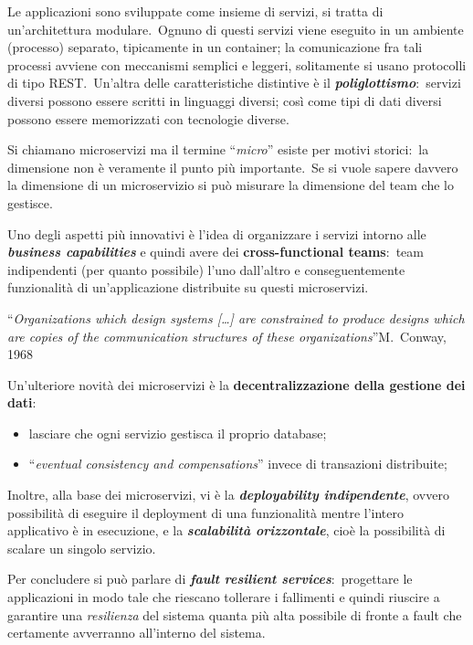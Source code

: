 Le applicazioni sono sviluppate come insieme di servizi, si tratta di un'architettura modulare.\
Ognuno di questi servizi viene eseguito in un ambiente (processo) separato, tipicamente in un container; la comunicazione fra tali processi avviene con meccanismi semplici e leggeri, solitamente si usano protocolli di tipo REST.\
Un'altra delle caratteristiche distintive è il \textbf{\textit{poliglottismo}}:\ servizi diversi possono essere scritti in linguaggi diversi; così come tipi di dati diversi possono essere memorizzati con tecnologie diverse.\

Si chiamano microservizi ma il termine ``\textit{micro}'' esiste per motivi storici:\ la dimensione non è veramente il punto più importante.\
Se si vuole sapere davvero la dimensione di un microservizio si può misurare la dimensione del team che lo gestisce.\

Uno degli aspetti più innovativi è l'idea di organizzare i servizi intorno alle \textbf{\textit{business capabilities}} e quindi avere dei \textbf{cross-functional teams}:\ team indipendenti (per quanto possibile) l'uno dall'altro e conseguentemente funzionalità di un'applicazione distribuite su questi microservizi.\

\vspace{12pt}
\noindent``\textit{Organizations which design systems [\dots] are constrained to produce designs which are copies of the communication structures of these organizations}''\qquad M.\ Conway, 1968
\vspace{12pt}

\noindent Un'ulteriore novità dei microservizi è la \textbf{decentralizzazione della gestione dei dati}:\
\begin{itemize}
	\item lasciare che ogni servizio gestisca il proprio database;
	\item ``\textit{eventual consistency and compensations}'' invece di transazioni distribuite;
\end{itemize}

\noindent Inoltre, alla base dei microservizi, vi è la \textbf{\textit{deployability indipendente}}, ovvero possibilità di eseguire il deployment di una funzionalità mentre l'intero applicativo è in esecuzione, e la \textbf{\textit{scalabilità orizzontale}}, cioè la possibilità di scalare un singolo servizio.\

Per concludere si può parlare di \textbf{\textit{fault resilient services}}:\ progettare le applicazioni in modo tale che riescano tollerare i fallimenti e quindi riuscire a garantire una \textit{resilienza} del sistema quanta più alta possibile di fronte a fault che certamente avverranno all'interno del sistema.\

